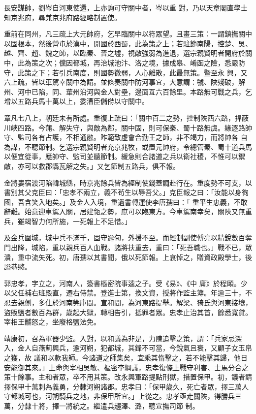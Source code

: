 \begin{pinyinscope}
 長安謀帥，劉岑自河東使還，上亦詢可守關中者，岑以重
 對，乃以天章閣直學士知京兆府，尋兼京兆府路經略制置使。



 重前在同州，凡三疏上大元帥府，乞早臨關中以符眾望。且畫三策：一謂鎮撫關中以固根本，然後營屯於漢中，開國於西蜀，此為策之上；若駐節南陽，控楚、吳、越、齊、趙、魏之師，以臨秦、晉之墟，視敵強弱為進退，選宗親賢明者開府於關中，此為策之次；儻因都城，再治城池汴、洛之境，據成皋、崤函之險，悉嚴防守，此策之下；若引兵南度，則國勢微弱，人心離散，此最無策。暨至永
 興，又六上疏，皆以車駕幸關中為請。並條奏關中防河事宜，大意謂：虢、陜殘破，解州、河中已陷，同、華州沿河與金人對壘，邊面亙六百餘里。本路無可戰之兵，乞增以五路兵馬十萬以上，委漕臣儲偫以守關中。



 章凡七八上，朝廷未有所處。重復上疏曰：「關中百二之勢，控制陜西六路，捍蔽川峽四路。今蒲、解失守，與敵為鄰，關中固，則可保秦、蜀十路無虞。緣逐路帥守、監司各有占護，不相通融。昨範致虛會合勤王之師，非不竭力，而將帥各
 自為謀，不聽節制。乞選宗親賢明者充京兆牧，或置元帥府，令總管秦、蜀十道兵馬以便宜從事，應帥守、監司並聽節制。緩急則合諸道之兵以衛社稷，不惟可以禦敵，亦可以救郡縣瓦解之失。」又乞節制五路兵，俱不報。



 金將婁宿渡河陷韓城縣，時京兆餘兵皆為經制使錢蓋調赴行在。重度勢不可支，以書別其父克臣曰：「忠孝不兩立，義不茍生以辱吾父。」克臣報之曰：「汝能以身徇國，吾含笑入地矣。」及金人入境，重遺書轉運使李唐孺曰：「
 重平生忠義，不敢辭難。始意迎車駕入關，居建瓴之勢，庶可以臨東方。今車駕南幸矣，關陜又無重兵，雖竭智力何所施，一死報上不足惜。」



 及金兵圍城，城中兵不滿千，固守逾旬，外援不至。而經制副使傅亮以精銳數百奪門出降，城陷，重以親兵百人血戰。諸將扶重去，重曰：「死吾職也。」戰不已，眾潰，重中流矢死。初，唐孺以其書聞，俄以死節報。上哀悼之，贈資政殿學士，後謚恭愍。



 郭忠孝，字立之，河南人，簽書樞密院事逵之子。受《易》、《中
 庸》於程頤。少以父任補右班殿直，遷右侍禁。登進士第，換文資，授將作監主簿。年逾三十，不忍去親側，多仕於河南筦庫間。宣和間，為河東路提舉。解梁、猗氏與河東接壤，盜販鹽者數百為群，歲起大獄，轉相告引，抵罪者眾。忠孝止治其首，餘悉寬貸。宰相王黼怒之，坐廢格鹽法免。



 靖康初，召為軍器少監。入對，以和議為非是，力陳追擊之策，謂：「兵家忌深入，金人自燕薊興兵，逾河朔，犯都城，其鋒不可當，今銳氣且衰，又顧子女玉帛之獲，故
 議和以款我師。今諸道之師集矣，宜乘其惰擊之，若不能擊其歸，他日安能御其來。」上命與宰相吳敏、樞密李綱議，忠孝復條上戰守利害、士馬分合之策十餘事。主和者眾，卒不用其策。改永興軍路提點刑獄，措置保甲。初，議者請擇保甲十萬刺為義勇，分隸河朔諸郡。忠孝曰：「保甲歲久，死亡者眾，擇三萬人守都城可也，河朔騎兵之地，非保甲所宜。」上從之。忠孝亟走關陜，得勝兵三萬，分隸十將，擇一將統之。繼遣兵趨澤、潞，聽宣撫司節
 制。




\end{pinyinscope}
